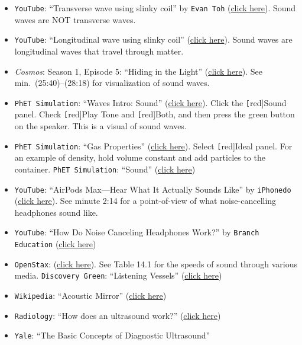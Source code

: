 \documentclass{article}
\numberwithin{equation}{section}
\numberwithin{figure}{section}
\begin{document}
\begin{itemize}
    \item \texttt{YouTube}: ``Transverse wave using slinky coil'' by \texttt{Evan Toh} (\href{https://youtu.be/g8GcMn7K0u4}{click here}). Sound waves are NOT transverse waves.
    \item \texttt{YouTube}: ``Longitudinal wave using slinky coil'' (\href{https://youtu.be/fMJrtheQfZw}{click here}). Sound waves are longitudinal waves that travel through matter.
    \item \textit{Cosmos}: Season 1, Episode 5: ``Hiding in the Light'' (\href{https://www.amazon.com/Cosmos-Spacetime-Odyssey-Season-1/dp/B00IHCHOGQ}{click here}). See min.~(25:40)--(28:18) for visualization of sound waves.
    \item \texttt{PhET Simulation}:  ``Waves Intro: Sound'' (\href{https://phet.colorado.edu/sims/html/waves-intro/latest/waves-intro_en.html}{click here}). Click the \texttt[red]{Sound} panel. Check \texttt[red]{Play Tone} and \texttt[red]{Both}, and then press the green button on the speaker. This is a visual of sound waves.
    \item \texttt{PhET Simulation}: ``Gas Properties'' (\href{https://phet.colorado.edu/sims/html/gas-properties/latest/gas-properties_en.html}{click here}). Select \texttt[red]{Ideal} panel. For an example of density, hold volume constant and add particles to the container.
    \texttt{PhET Simulation}: ``Sound'' (\href{https://phet.colorado.edu/en/simulations/sound}{click here})
    \item \texttt{YouTube}: ``AirPods Max---Hear What It Actually Sounds Like'' by \texttt{iPhonedo} (\href{https://youtu.be/97gTzS9VFxo?t=134}{click here}). See minute 2:14 for a point-of-view of what noise-cancelling headphones sound like.
    \item \texttt{YouTube}: ``How Do Noise Canceling Headphones Work?'' by \texttt{Branch Education} (\href{https://youtu.be/VIi04uD8LtY}{click here})
    \item \texttt{OpenStax}: (\href{https://openstax.org/books/physics/pages/14-1-speed-of-sound-frequency-and-wavelength#Table_14_01}{click here}). See Table 14.1 for the speeds of sound through various media. 
    \texttt{Discovery Green}: ``Listening Vessels'' (\href{https://www.discoverygreen.com/listening-vessels}{click here})
    \item \texttt{Wikipedia}: ``Acoustic Mirror'' (\href{https://en.wikipedia.org/wiki/Acoustic_mirror}{click here})
    \item \texttt{Radiology}: ``How does an ultrasound work?'' (\href{https://www.radiology.ca/article/how-does-ultrasound-work#}{click here})
    \item \texttt{Yale}: ``The Basic Concepts of Diagnostic Ultrasound''
\end{itemize}
\end{document}
